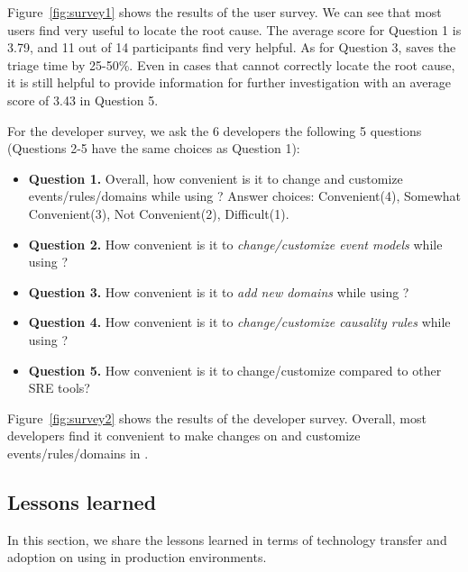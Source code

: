 Figure~\ref{fig:survey1} shows the results of the user survey. We can see that most users find \system very useful to locate the root cause. The average score for Question 1 is 3.79, and 11 out of 14 participants find \system very helpful. As for Question 3, \system saves the triage time by 25-50\%. Even in cases that \system cannot correctly locate the root cause, it is still helpful to provide information for further investigation with an average score of 3.43 in Question 5.

For the developer survey, we ask the 6 developers the following 5 questions (Questions 2-5 have the same choices as Question 1):
\begin{itemize}
    \item \textbf{Question 1.} Overall, how convenient is it to change and customize events/rules/domains while using  \system? Answer choices: Convenient(4), Somewhat Convenient(3), Not Convenient(2), Difficult(1).
    \item \textbf{Question 2.} How convenient is it to \emph{change/customize event models} while using \system? 
    \item \textbf{Question 3.} How convenient is it to \emph{add new domains} while using \system? 
    \item \textbf{Question 4.} How convenient is it to \emph{change/customize causality rules} while using \system? 
    \item \textbf{Question 5.} How convenient is it to change/customize \system compared to other SRE tools? 
\end{itemize}

Figure~\ref{fig:survey2} shows the results of the developer survey. Overall, most developers find it convenient to make changes on and customize events/rules/domains in \system. %

\subsection{Lessons learned}
In this section, we share the lessons learned in terms of technology transfer and adoption on using \system in production environments.

